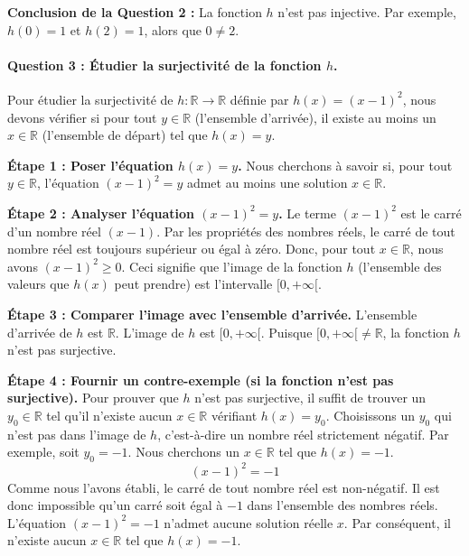 \documentclass[12pt,a4paper]{report}
\begin{document}
\textbf{Conclusion de la Question 2 :} La fonction \(h\) n'est pas
injective. Par exemple, \(h(0) = 1\) et \(h(2) = 1\), alors que
\(0 \neq 2\).

\paragraph{\texorpdfstring{Question 3 : Étudier la surjectivité de la
fonction
\(h\).}{Question 3 : Étudier la surjectivité de la fonction h.}}\label{question-3-uxe9tudier-la-surjectivituxe9-de-la-fonction-h.}

Pour étudier la surjectivité de \(h: \mathbb{R} \to \mathbb{R}\) définie
par \(h(x) = (x-1)^2\), nous devons vérifier si pour tout
\(y \in \mathbb{R}\) (l'ensemble d'arrivée), il existe au moins un
\(x \in \mathbb{R}\) (l'ensemble de départ) tel que \(h(x) = y\).

\textbf{Étape 1 : Poser l'équation \(h(x) = y\).} Nous cherchons à
savoir si, pour tout \(y \in \mathbb{R}\), l'équation \((x-1)^2 = y\)
admet au moins une solution \(x \in \mathbb{R}\).

\textbf{Étape 2 : Analyser l'équation \((x-1)^2 = y\).} Le terme
\((x-1)^2\) est le carré d'un nombre réel \((x-1)\). Par les propriétés
des nombres réels, le carré de tout nombre réel est toujours supérieur
ou égal à zéro. Donc, pour tout \(x \in \mathbb{R}\), nous avons
\((x-1)^2 \ge 0\). Ceci signifie que l'image de la fonction \(h\)
(l'ensemble des valeurs que \(h(x)\) peut prendre) est l'intervalle
\([0, +\infty[\).

\textbf{Étape 3 : Comparer l'image avec l'ensemble d'arrivée.}
L'ensemble d'arrivée de \(h\) est \(\mathbb{R}\). L'image de \(h\) est
\([0, +\infty[\). Puisque \([0, +\infty[ \neq \mathbb{R}\), la fonction
\(h\) n'est pas surjective.

\textbf{Étape 4 : Fournir un contre-exemple (si la fonction n'est pas
surjective).} Pour prouver que \(h\) n'est pas surjective, il suffit de
trouver un \(y_0 \in \mathbb{R}\) tel qu'il n'existe aucun
\(x \in \mathbb{R}\) vérifiant \(h(x) = y_0\). Choisissons un \(y_0\)
qui n'est pas dans l'image de \(h\), c'est-à-dire un nombre réel
strictement négatif. Par exemple, soit \(y_0 = -1\). Nous cherchons un
\(x \in \mathbb{R}\) tel que \(h(x) = -1\). \[(x-1)^2 = -1\] Comme nous
l'avons établi, le carré de tout nombre réel est non-négatif. Il est
donc impossible qu'un carré soit égal à \(-1\) dans l'ensemble des
nombres réels. L'équation \((x-1)^2 = -1\) n'admet aucune solution
réelle \(x\). Par conséquent, il n'existe aucun \(x \in \mathbb{R}\) tel
que \(h(x) = -1\).
\end{document}
